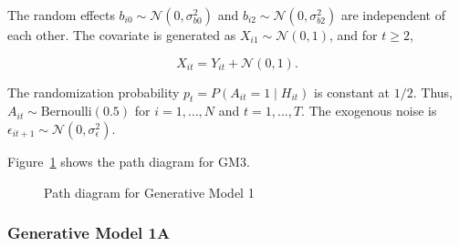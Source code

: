 \documentclass[
  12pt,
  a4paper,
]{article}
\begin{document}
The random effects \(b_{i0} \sim \mathcal{N}(0, \sigma_{b0}^2)\) and
\(b_{i2} \sim \mathcal{N}(0, \sigma_{b2}^2)\) are independent of each
other. The covariate is generated as \(X_{i1} \sim \mathcal{N}(0, 1)\),
and for \(t \geq 2\),

\[
X_{it} = Y_{it} + \mathcal{N}(0, 1).
\]

The randomization probability \(p_t = P(A_{it} = 1 \mid H_{it})\) is
constant at \(1/2\). Thus, \(A_{it} \sim \text{Bernoulli}(0.5)\) for
\(i = 1, \ldots, N\) and \(t = 1, \ldots, T\). The exogenous noise is
\(\epsilon_{it+1} \sim \mathcal{N}(0, \sigma_\epsilon^2)\).

Figure~\ref{fig-GM1_path} shows the path diagram for GM3.

\begin{figure}[H]

\caption{\label{fig-GM1_path}Path diagram for Generative Model 1}


\end{figure}%

\subsubsection{Generative Model 1A}\label{generative-model-1a}
\end{document}
